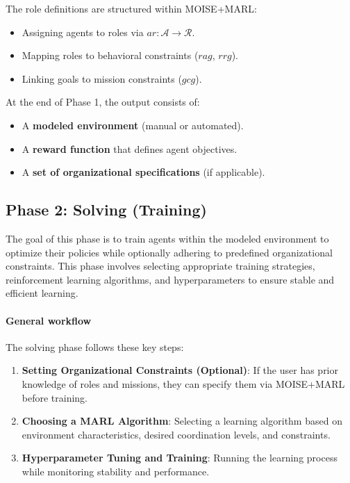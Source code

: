 \documentclass[pdflatex,sn-mathphys-num]{sn-jnl}%
\theoremstyle{thmstyleone}%
\theoremstyle{thmstyletwo}%
\theoremstyle{thmstylethree}%
\begin{document}
The role definitions are structured within MOISE+MARL:
\begin{itemize}
    \item Assigning agents to roles via $ar: \mathcal{A} \to \mathcal{R}$.
    \item Mapping roles to behavioral constraints ($rag$, $rrg$).
    \item Linking goals to mission constraints ($gcg$).
\end{itemize}

At the end of Phase 1, the output consists of:
\begin{itemize}
    \item A \textbf{modeled environment} (manual or automated).
    \item A \textbf{reward function} that defines agent objectives.
    \item A \textbf{set of organizational specifications} (if applicable).
\end{itemize}


\subsection{Phase 2: Solving (Training)}

The goal of this phase is to train agents within the modeled environment to optimize their policies while optionally adhering to predefined organizational constraints. This phase involves selecting appropriate training strategies, reinforcement learning algorithms, and hyperparameters to ensure stable and efficient learning.

\paragraph{\textbf{General workflow}}
The solving phase follows these key steps:
\begin{enumerate}
    \item \textbf{Setting Organizational Constraints (Optional)}: If the user has prior knowledge of roles and missions, they can specify them via MOISE+MARL before training.
    \item \textbf{Choosing a MARL Algorithm}: Selecting a learning algorithm based on environment characteristics, desired coordination levels, and constraints.
    \item \textbf{Hyperparameter Tuning and Training}: Running the learning process while monitoring stability and performance.
\end{enumerate}
\end{document}
